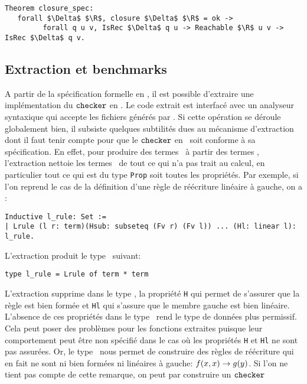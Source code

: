 \begin{lstlisting}
Theorem closure_spec:
   forall $\Delta$ $\R$, closure $\Delta$ $\R$ = ok ->
         forall q u v, IsRec $\Delta$ q u -> Reachable $\R$ u v -> IsRec $\Delta$ q v.
\end{lstlisting}

\subsection{Extraction et benchmarks}
\label{sec:benchmarks}

A partir de la spécification formelle en \coq, il est possible d'extraire une implémentation
du $\mathtt{checker}$ en \ocaml. 
Le code extrait est interfacé avec un analyseur syntaxique qui accepte les fichiers générés
par \timbuk. Si cette opération se déroule globalement bien, il subsiste quelques subtilités
dues au mécanisme d'extraction dont il faut tenir compte pour que le $\mathtt{checker}$ en \ocaml\ soit conforme 
à sa spécification. En effet, pour produire des termes \ocaml\ à partir des termes \coq, l'extraction
nettoie les termes \coq\ de tout ce qui n'a pas trait au calcul, en particulier tout ce qui est du type
\lstinline!Prop! soit toutes les propriétés. Par exemple, si l'on reprend le cas de la définition 
d'une règle de réécriture linéaire à gauche, on a :
\begin{lstlisting}
Inductive l_rule: Set :=
| Lrule (l r: term)(Hsub: subseteq (Fv r) (Fv l)) ... (Hl: linear l): l_rule.
\end{lstlisting}
L'extraction produit le type \ocaml\ suivant:
\switchlstcaml
\begin{lstlisting}
type l_rule = Lrule of term * term
\end{lstlisting}
L'extraction supprime dans le type \ocaml, la propriété \lstinline!H! qui permet de s'assurer que la règle est bien
formée et \lstinline!Hl! qui s'assure que le membre gauche est bien linéaire. L'absence de ces propriétés dans le type 
\ocaml\ rend le type de données plus permissif. Cela peut poser des problèmes pour les fonctions extraites puisque
leur comportement peut être non spécifié dans le cas où les propriétés \lstinline!H! et \lstinline!Hl! ne sont pas
assurées. Or, le type \ocaml\ nous permet de construire des règles de réécriture qui en fait ne sont ni bien formées ni
linéaires à gauche: $f(x,x) \rightarrow g(y)$. Si l'on ne tient pas compte de cette remarque, on peut par construire un $\mathtt{checker}$

